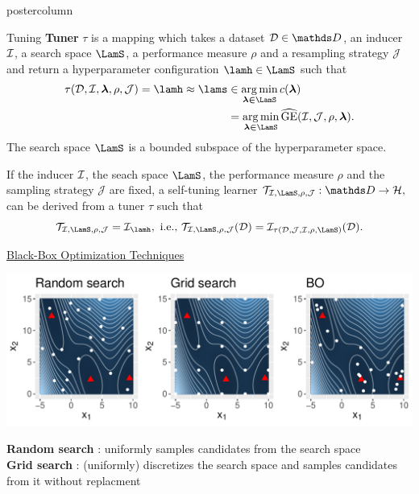 \documentclass{beamer}
\begin{document}
\begin{frame}[fragile]{}
\begin{columns}
\begin{column}{.31\textwidth}
\begin{beamercolorbox}[center]{postercolumn}
\begin{minipage}{.98\textwidth}
{\begin{myblock}{Tuning}
\textbf{Tuner} $\tau$ is a mapping which takes a dataset $\D \in \allDatasets$, an inducer $\mathcal{I}$, a search space $\LamS$, a performance measure $\rho$ and a resampling strategy $\mathcal{J}$ and 
return a hyperparameter configuration $\lamh \in \LamS$ such that 
\begin{align*}
    \tau(\D, \ind, \boldsymbol{\lambda}, \rho, \mathcal{J}) = \lamh \approx \lams &\in 
    \argmin \limits_{\boldsymbol{\lambda \in \LamS}} c(\lamv) \\
    &= \argmin \limits_{\boldsymbol{\lambda \in \LamS}} \GEh(\ind, \mathcal{J}, \rho, \lamv).
\end{align*}
The search space $\LamS$ is a bounded subspace of the hyperparameter space.

If the inducer $\mathcal{I}$, the seach space $\LamS$, the performance measure $\rho$
and the sampling strategy $\mathcal{J}$ are fixed, a self-tuning learner 
$\mathcal{T}_{\ind, \LamS, \rho, \mathcal{J}}: \allDatasets \rightarrow \Hspace,$ can be derived
from a tuner $\tau$ such that
$$\mathcal{T}_{\ind,\LamS,\rho,\mathcal{J}} = \ind_{\lamh}, \text{ i.e., } 
\mathcal{T}_{\ind,\LamS,\rho,\mathcal{J}}(\D) = \ind_{\tau(\D,\mathcal{J},\ind, \rho, \LamS)}(\D).$$

\underline{Black-Box Optimization Techniques}\\

 \begin{center}
             \includegraphics[width=0.95\columnwidth]{figure/bb_cmp.pdf}
               \end{center}
\textbf{Random search} : uniformly samples candidates from the search space\\

\textbf{Grid search} : (uniformly) discretizes the search space and samples candidates from it without replacment\\ 

\end{myblock}



}
\end{minipage}
\end{beamercolorbox}
\end{column}
\end{columns}
\end{frame}
\end{document}
